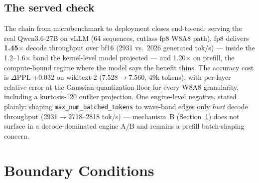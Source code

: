 \documentclass[10pt,twocolumn]{article}
\begin{document}
\subsection{The served check}
The chain from microbenchmark to deployment closes end-to-end: serving the real Qwen3.6-27B on vLLM (64 sequences, cutlass fp8 W8A8 path), fp8 delivers \textbf{1.45$\times$} decode throughput over bf16 (2931 vs.\ 2026 generated tok/s) --- inside the 1.2--1.6$\times$ band the kernel-level model projected --- and 1.20$\times$ on prefill, the compute-bound regime where the model says the benefit thins.  The accuracy cost is $\Delta$PPL $+0.032$ on wikitext-2 (7.528$\to$7.560, 49k tokens), with per-layer relative error at the Gaussian quantization floor for every W8A8 granularity, including a kurtosis-120 outlier projection.  One engine-level negative, stated plainly: shaping \texttt{max\_num\_batched\_tokens} to wave-band edges only \emph{hurt} decode throughput (2931$\to$2718--2818 tok/s) --- mechanism~B (Section~\ref{sec:boundary}) does not surface in a decode-dominated engine A/B and remains a prefill batch-shaping concern.

\section{Boundary Conditions}
\label{sec:boundary}
\end{document}

